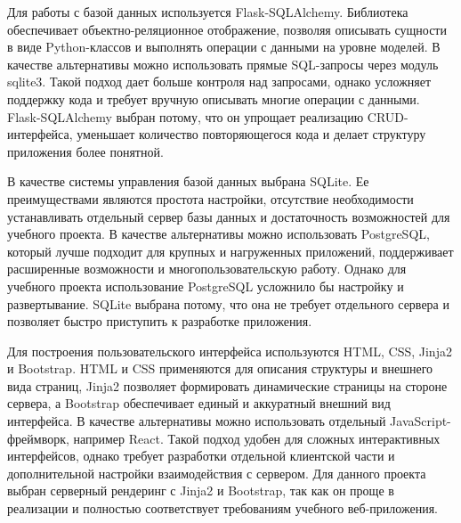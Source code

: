 Для работы с базой данных используется Flask-SQLAlchemy. Библиотека обеспечивает объектно-реляционное отображение, позволяя описывать сущности в виде Python-классов и выполнять операции с данными на уровне моделей. В качестве альтернативы можно использовать прямые SQL-запросы через модуль sqlite3. Такой подход дает больше контроля над запросами, однако усложняет поддержку кода и требует вручную описывать многие операции с данными. Flask-SQLAlchemy выбран потому, что он упрощает реализацию CRUD-интерфейса, уменьшает количество повторяющегося кода и делает структуру приложения более понятной.

В качестве системы управления базой данных выбрана SQLite. Ее преимуществами являются простота настройки, отсутствие необходимости устанавливать отдельный сервер базы данных и достаточность возможностей для учебного проекта. В качестве альтернативы можно использовать PostgreSQL, который лучше подходит для крупных и нагруженных приложений, поддерживает расширенные возможности и многопользовательскую работу. Однако для учебного проекта использование PostgreSQL усложнило бы настройку и развертывание. SQLite выбрана потому, что она не требует отдельного сервера и позволяет быстро приступить к разработке приложения.

Для построения пользовательского интерфейса используются HTML, CSS, Jinja2 и Bootstrap. HTML и CSS применяются для описания структуры и внешнего вида страниц, Jinja2 позволяет формировать динамические страницы на стороне сервера, а Bootstrap обеспечивает единый и аккуратный внешний вид интерфейса. В качестве альтернативы можно использовать отдельный JavaScript-фреймворк, например React. Такой подход удобен для сложных интерактивных интерфейсов, однако требует разработки отдельной клиентской части и дополнительной настройки взаимодействия с сервером. Для данного проекта выбран серверный рендеринг с Jinja2 и Bootstrap, так как он проще в реализации и полностью соответствует требованиям учебного веб-приложения.

